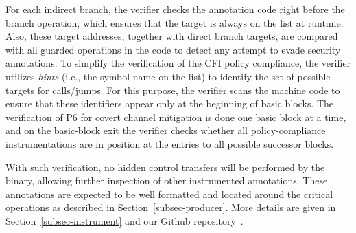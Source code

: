 For each indirect branch, the verifier checks the annotation code \DIFdelbegin {}\DIFdelend right before the branch operation, which ensures that the target is always on the list at runtime. Also, these target addresses, together with direct branch targets, are compared with all guarded operations in the code to detect any attempt to evade security annotations. To simplify the verification of the CFI policy compliance, the verifier utilizes \textit{hints} (i.e., the symbol  name on the list) to identify the set of possible targets for calls/jumps. For this purpose, the verifier scans the machine code  to ensure that these identifiers appear only at the beginning of basic blocks. The verification of P6 for covert channel mitigation is done one basic block at a time, and on the basic-block exit the verifier checks whether all policy-compliance instrumentations are in position at the entries to all possible successor blocks.
\DIFdelbegin %


\DIFdelend With such verification, no hidden control transfers will be performed by the binary, allowing further inspection of other instrumented annotations. These annotations are expected to be well formatted and located around the critical operations as described in Section~\ref{subsec-producer}. %
More details are given in Section~\ref{subsec-instrument} and our Github repository~\cite{our-prototype}.




